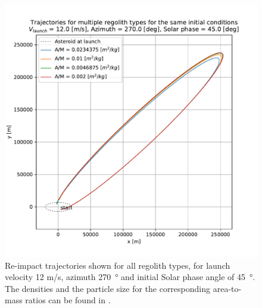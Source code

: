 \documentclass[print]{tudelft-report}
\begin{document}
\begin{appendices}
\begin{figure}[htb]
    \includegraphics[width=\textwidth, height=0.5\textheight, keepaspectratio=true]{Results/Images/trailing_edge_perturbations/reimpact_traj_12ms_270Azim_45solarPhase.pdf}
    \caption{Re-impact trajectories shown for all regolith types, for launch velocity 12 m/s, azimuth \SI{270}{\degree} and initial Solar phase angle of \SI{45}{\degree}. The densities and the particle size for the corresponding area-to-mass ratios can be found in .}
    \label{fig:trailingEdge_reimpact_traj_12ms_270azim_45solar}
    \end{figure}
    \FloatBarrier
    \begin{figure}[htb]
    \centering
    \captionsetup{justification=centering}

\end{figure}
\end{appendices}
\end{document}
